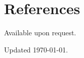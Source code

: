 \documentclass[10.5pt, oneside]{article}   	%
\begin{document}
\section*{References}
Available upon request.

\vspace*{\fill}
Updated \today.
\end{document}
